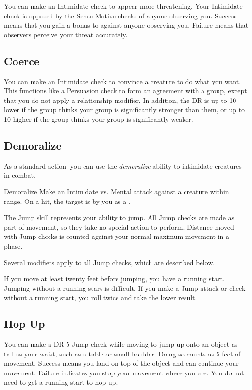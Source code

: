         You can make an Intimidate check to appear more threatening.
        Your Intimidate check is opposed by the Sense Motive checks of anyone observing you.
        Success means that you gain a  bonus to  against anyone observing you.
        Failure means that observers perceive your threat accurately.

    \subsection{Coerce}
        You can make an Intimidate check to convince a creature to do what you want. This functions like a Persuasion check to form an agreement with a group, except that you do not apply a relationship modifier. In addition, the DR is up to 10 lower if the group thinks your group is significantly stronger than them, or up to 10 higher if the group thinks your group is significantly weaker.

    \subsection{Demoralize}\label{Demoralize}

        As a standard action, you can use the \textit{demoralize} ability to intimidate creatures in combat.

        \begin{ability}{Demoralize}
            Make an Intimidate vs. Mental attack against a creature within \rngmed range.
            On a hit, the target is \shaken by you as a .
        \end{ability}

\newpage
{}
        The Jump skill represents your ability to jump. All Jump checks are made as part of movement, so they take no special action to perform. Distance moved with Jump checks is counted against your normal maximum movement in a phase.

        Several modifiers apply to all Jump checks, which are described below.

        \label{Running Start} If you move at least twenty feet before jumping, you have a running start.
        Jumping without a running start is difficult.
        If you make a Jump attack or check without a running start, you roll twice and take the lower result.

    \subsection{Hop Up}
        You can make a DR 5 Jump check while moving to jump up onto an object as tall as your waist, such as a table or small boulder. Doing so counts as 5 feet of movement. Success means you land on top of the object and can continue your movement. Failure indicates you stop your movement where you are. You do not need to get a running start to hop up.

